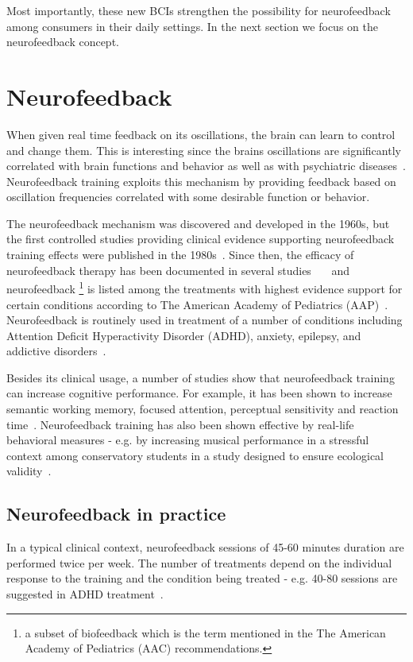 \documentclass[a4paper,10pt,english,lof,lot,twoside]{puthesis}
\begin{document}
Most importantly, these new BCIs strengthen the possibility for neurofeedback
among consumers in their daily settings. In the next section we focus on the
neurofeedback concept.


\section{Neurofeedback}
\label{ch-background/index:neurofeedback}
When given real time feedback on its oscillations, the brain can learn to
control and change them. This is interesting since the brains oscillations are
significantly correlated with brain functions and behavior as well as with
psychiatric diseases \cite{zoefel_neurofeedback_2011}. Neurofeedback
training exploits this mechanism by providing feedback based on oscillation
frequencies correlated with some desirable function or behavior.

The neurofeedback mechanism was discovered and developed in the 1960s, but the
first controlled studies providing clinical evidence supporting neurofeedback
training effects were published in the 1980s \cite{angelakis_eeg_2007}. Since then, the efficacy of neurofeedback therapy
has been documented in several studies \cite{lofthouse_review_2012} \cite{arns_efficacy_2009} \cite{white_alphatheta_2009} and
neurofeedback \footnote{
a subset of biofeedback which is the term mentioned in the The American
Academy of Pediatrics (AAC) recommendations.
} is listed among the treatments with highest evidence
support for certain conditions according to The American Academy of Pediatrics
(AAP) \cite{_aap_2013}. Neurofeedback is routinely used in
treatment of a number of conditions including Attention Deficit Hyperactivity
Disorder (ADHD), anxiety, epilepsy, and addictive disorders \cite{angelakis_eeg_2007}.

Besides its clinical usage, a number of studies show that neurofeedback training
can increase cognitive performance. For example, it has been shown to increase
semantic working memory,
focused attention, perceptual sensitivity and reaction time \cite{angelakis_eeg_2007}. Neurofeedback training has also been shown
effective by real-life behavioral measures - e.g. by increasing musical
performance in a stressful context among conservatory students in a study
designed to ensure ecological validity \cite{egner_ecological_2003}.


\subsection{Neurofeedback in practice}
\label{ch-background/index:neurofeedback-in-practice}
In a typical clinical context, neurofeedback sessions of 45-60 minutes duration
are performed twice per week. The number of treatments depend on the individual
response to the training and the condition being treated - e.g. 40-80 sessions
are suggested in ADHD treatment \cite{angelakis_eeg_2007}.
\end{document}
